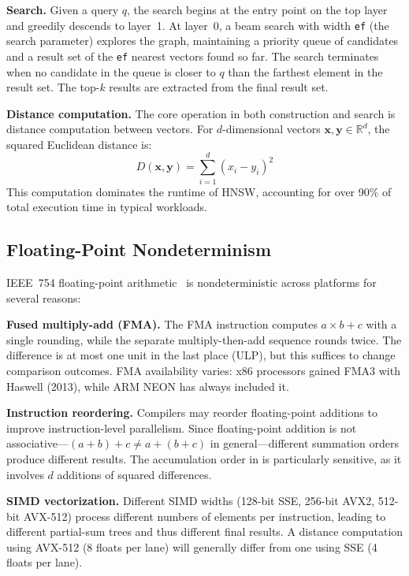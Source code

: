 \documentclass[10pt,journal]{IEEEtran}
\newcommand{\hnsw}{\textsc{HNSW}}
\begin{document}
\textbf{Search.} Given a query $q$, the search begins at the entry point on the top layer and greedily descends to layer~1. At layer~0, a beam search with width \texttt{ef} (the search parameter) explores the graph, maintaining a priority queue of candidates and a result set of the \texttt{ef} nearest vectors found so far. The search terminates when no candidate in the queue is closer to $q$ than the farthest element in the result set. The top-$k$ results are extracted from the final result set.

\textbf{Distance computation.} The core operation in both construction and search is distance computation between vectors. For $d$-dimensional vectors $\mathbf{x}, \mathbf{y} \in \mathbb{R}^d$, the squared Euclidean distance is:
\begin{equation}
  \label{eq:l2dist}
  D(\mathbf{x}, \mathbf{y}) = \sum_{i=1}^{d} (x_i - y_i)^2
\end{equation}
This computation dominates the runtime of \hnsw{}, accounting for over 90\% of total execution time in typical workloads.

\subsection{Floating-Point Nondeterminism}
\label{sec:fp_nondet}

IEEE~754 floating-point arithmetic~\cite{goldberg1991float} is nondeterministic across platforms for several reasons:

\textbf{Fused multiply-add (FMA).} The FMA instruction computes $a \times b + c$ with a single rounding, while the separate multiply-then-add sequence rounds twice. The difference is at most one unit in the last place (ULP), but this suffices to change comparison outcomes. FMA availability varies: x86 processors gained FMA3 with Haswell (2013), while ARM NEON has always included it.

\textbf{Instruction reordering.} Compilers may reorder floating-point additions to improve instruction-level parallelism. Since floating-point addition is not associative---$(a + b) + c \neq a + (b + c)$ in general---different summation orders produce different results. The accumulation order in  is particularly sensitive, as it involves $d$ additions of squared differences.

\textbf{SIMD vectorization.} Different SIMD widths (128-bit SSE, 256-bit AVX2, 512-bit AVX-512) process different numbers of elements per instruction, leading to different partial-sum trees and thus different final results. A distance computation using AVX-512 (8 floats per lane) will generally differ from one using SSE (4 floats per lane).
\end{document}
